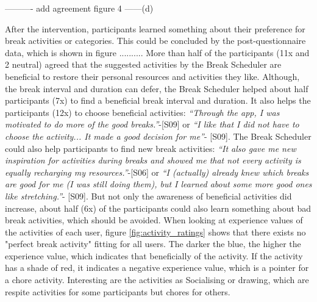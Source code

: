\documentclass{hasel_thesis}
\begin{document}
---------- add agreement figure 4 ------(d)

After the intervention, participants learned something about their preference for break activities or categories. This could be concluded by the post-questionnaire data, which is shown in figure .......... More than half of the participants (11x and 2 neutral) agreed that the suggested activities by the Break Scheduler are beneficial to restore their personal resources and activities they like. Although, the break interval and duration can defer, the Break Scheduler helped about half participants (7x) to find a beneficial break interval and duration. It also helps the participants (12x) to choose beneficial activities: \textit{“Through the app, I was motivated to do more of the good breaks.”}-[S09] or \textit{“I like that I did not have to choose the activity... It made a good decision for me”}- [S09]. The Break Scheduler could also help participants to find new break activities: \textit{“It also gave me new inspiration for activities during breaks and showed me that not every activity is equally recharging my resources.”}-[S06] or \textit{“I (actually) already knew which breaks are good for me (I was still doing them), but I learned about some more good ones like stretching.”}- [S09]. But not only the awareness of beneficial activities did increase, about half (6x) of the participants could also learn something about bad break activities, which should be avoided. When looking at experience values of the activities of each user, figure \ref{fig:activity_ratings} shows that there exists no "perfect break activity" fitting for all users. The darker the blue, the higher the experience value, which indicates that beneficially of the activity. If the activity has a shade of red, it indicates a negative experience value, which is a pointer for a chore activity. Interesting are the activities as Socialising or drawing, which are respite activities for some participants but chores for others. 
\end{document}
